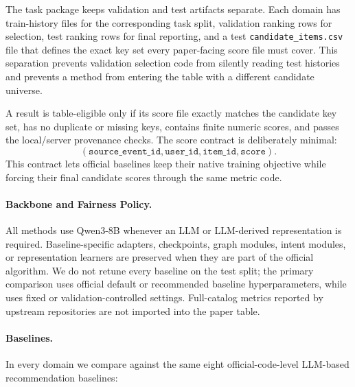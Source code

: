 The task package keeps validation and test artifacts separate. Each domain has
train-history files for the corresponding task split, validation ranking rows
for selection, test ranking rows for final reporting, and a test
\texttt{candidate\_items.csv} file that defines the exact key set every
paper-facing score file must cover. This separation prevents validation
selection code from silently reading test histories and prevents a method from
entering the table with a different candidate universe.

A result is table-eligible only if its score file exactly matches the candidate
key set, has no duplicate or missing keys, contains finite numeric scores, and
passes the local/server provenance checks. The score contract is deliberately
minimal:
\[
(\texttt{source\_event\_id},\texttt{user\_id},\texttt{item\_id},\texttt{score}).
\]
This contract lets official baselines keep their native training objective
while forcing their final candidate scores through the same metric code.

\paragraph{Backbone and Fairness Policy.} All methods use Qwen3-8B whenever an
LLM or LLM-derived representation is required. Baseline-specific adapters,
checkpoints, graph modules, intent modules, or representation learners are
preserved when they are part of the official algorithm. We do not retune every
baseline on the test split; the primary comparison uses official default or
recommended baseline hyperparameters, while \method{} uses fixed or
validation-controlled settings. Full-catalog metrics reported by upstream
repositories are not imported into the paper table.

\paragraph{Baselines.} In every domain we compare against the same eight
official-code-level LLM-based recommendation baselines:

